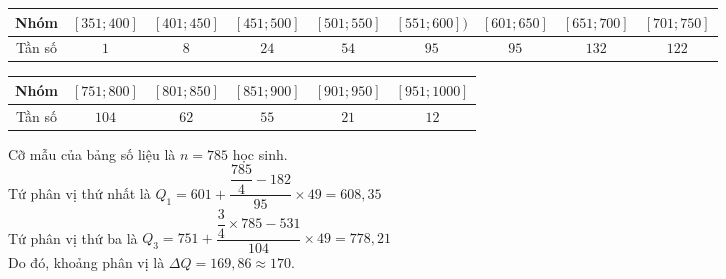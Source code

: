 \begin{bt}
{\begin{center}
\begin{tabular}{|c|c|c|c|c|c|c|c|c|}
		\hline Nhóm  &$[351 ; 400]$ & $[401 ; 450]$ & $[451 ; 500]$ &	$[501 ; 550]$ &	$[551 ; 600])$ & $[601 ; 650]$ & $[651 ; 700]$ & $[701 ; 750]$\\
		\hline Tần số & $1$ & $8$ & $24$ & $54$ &$95$& $95$ & $132$ & $122$ \\
		\hline
	\end{tabular}
\end{center}
	\begin{center}
	\begin{tabular}{|c|c|c|c|c|c|}
		\hline Nhóm  &	$[751 ; 800]$ &	$[801 ; 850]$& $[851 ; 900]$ & $[901 ; 950]$ &	$[951 ; 1000]$ \\
		\hline Tần số & $104$ &$62$& $55$ & $21$ & $12$ \\
		\hline
	\end{tabular}
\end{center}
Cỡ mẫu của bảng số liệu là $n=785$ học sinh.\\
Tứ phân vị thứ nhất là $Q_1=601+\dfrac{\dfrac{785}{4}-182}{95}\times 49=608{,}35$\\
Tứ phân vị thứ ba là $Q_3=751+\dfrac{\dfrac{3}{4}\times 785-531}{104}\times 49=778{,}21$\\
Do đó, khoảng phân vị là $\Delta Q=169{,}86\approx 170$.

}
\end{bt}

